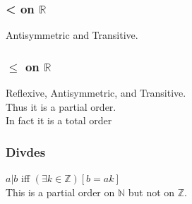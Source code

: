 \documentclass{article}
\begin{document}
\subsubsection*{< on $\mathbb{R}$}
Antisymmetric and Transitive.
\subsubsection*{$\leq$ on $\mathbb{R}$}
Reflexive, Antisymmetric, and Transitive.\\
Thus it is a partial order.\\
In fact it is a total order
\subsubsection*{Divdes}
$a|b$ iff $(\exists k \in \mathbb{Z})[b = ak]$\\
This is a partial order on $\mathbb{N}$ but not on $\mathbb{Z}$.
\end{document}
